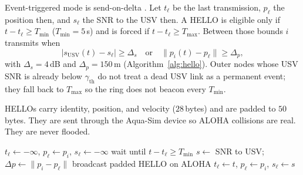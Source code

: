 \documentclass[journal]{IEEEtran}
\begin{document}
Event-triggered mode is send-on-delta
\cite{tabuada2007event,heemels2012event}. Let $t_{\ell}$ be the last
transmission, $p_{\ell}$ the position then, and $s_{\ell}$ the SNR
to the USV then. A HELLO is eligible only if $t-t_{\ell}\ge T_{\min}$
($T_{\min}=5$\,s) and is forced if $t-t_{\ell}\ge T_{\max}$. Between
those bounds $i$ transmits when
\begin{equation}
\bigl|s_{\mathrm{USV}}(t)-s_{\ell}\bigr|\ge\Delta_{s}
\quad\text{or}\quad
\|p_i(t)-p_{\ell}\|\ge\Delta_{p},
\label{eq:delta}
\end{equation}
with $\Delta_{s}=4$\,dB and $\Delta_{p}=150$\,m
(Algorithm~\ref{alg:hello}). Outer nodes whose USV SNR is already
below $\gamma_{\mathrm{th}}$ do not treat a dead USV link as a
permanent event; they fall back to $T_{\max}$ so the ring does not
beacon every $T_{\min}$.

HELLOs carry identity, position, and velocity ($28$\,bytes) and are
padded to $50$\,bytes. They are sent through the Aqua-Sim device so
ALOHA collisions are real. They are never flooded.

\begin{algorithm}[!t]
\caption{Event-triggered HELLO at node $i$}
\label{alg:hello}
\begin{algorithmic}[1]
\STATE $t_{\ell}\leftarrow -\infty$, $p_{\ell}\leftarrow p_{i}$, $s_{\ell}\leftarrow -\infty$
\LOOP
\STATE wait until $t-t_{\ell}\ge T_{\min}$
\STATE $s\leftarrow$ SNR to USV; $\Delta p\leftarrow \|p_{i}-p_{\ell}\|$
\STATE broadcast padded HELLO on ALOHA
\STATE $t_{\ell}\leftarrow t$, $p_{\ell}\leftarrow p_{i}$, $s_{\ell}\leftarrow s$
\ENDIF
\ENDLOOP
\end{algorithmic}
\end{algorithm}
\end{document}
